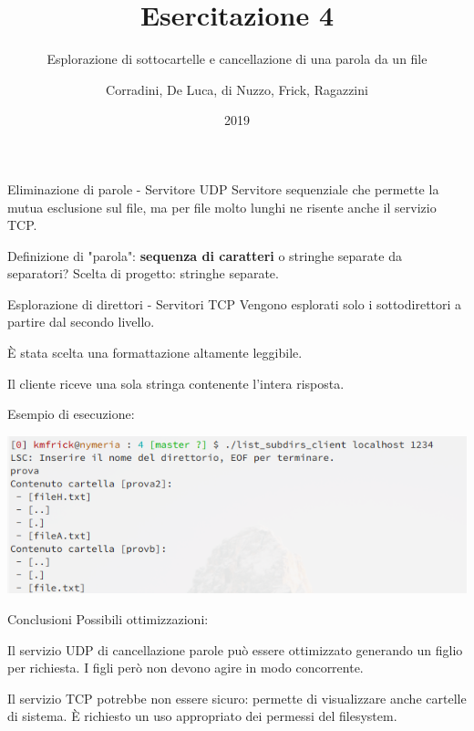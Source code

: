 \documentclass{beamer}
\begin{document}
\title{Esercitazione 4}
\subtitle{Esplorazione di sottocartelle e cancellazione di una parola da un file}
\author{Corradini, De Luca, di Nuzzo, Frick, Ragazzini}
\date{2019}
\begin{frame}
\titlepage
\end{frame}
\begin{frame}{Eliminazione di parole - Servitore UDP}
Servitore sequenziale che permette la mutua esclusione sul file, ma per file molto lunghi ne risente anche il servizio TCP.

Definizione di "parola": \textbf{sequenza di caratteri} o stringhe separate da separatori? 
Scelta di progetto: stringhe separate.
\end{frame}

\begin{frame}{Esplorazione di direttori - Servitori TCP}
  Vengono esplorati solo i sottodirettori a partire dal secondo livello.

  È stata scelta una formattazione altamente leggibile.

  Il cliente riceve una sola stringa contenente l'intera risposta.

  Esempio di esecuzione: 

  \includegraphics[width=\textwidth]{example}
\end{frame}
\begin{frame}{Conclusioni}
  Possibili ottimizzazioni:

  Il servizio UDP di cancellazione parole può essere ottimizzato generando un figlio per richiesta. 
  I figli però non devono agire in modo concorrente.

Il servizio TCP potrebbe non essere sicuro: permette di visualizzare anche cartelle di sistema. 
È richiesto un uso appropriato dei permessi del filesystem.
\end{frame}
\end{document}
